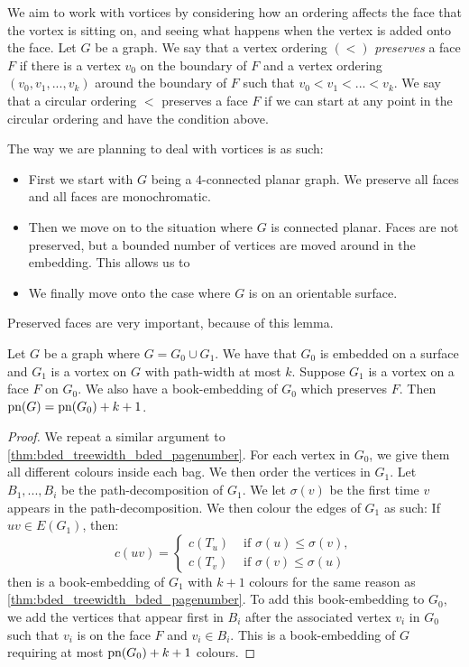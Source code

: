 We aim to work with vortices by considering how an ordering affects the face that the vortex is sitting on, and seeing what happens when the vertex is added onto the face.
Let $G$ be a graph. We say that a vertex ordering $(<)$ \textit{preserves} a face $F$ if there is a vertex $v_0$ on the boundary of $F$ and a vertex ordering $(v_0, v_1, ..., v_k)$ around the boundary of $F$ such that $v_0 < v_1 < ... < v_k$. We say that a circular ordering $<$ preserves a face $F$ if we can start at any point in the circular ordering and have the condition above. 

The way we are planning to deal with vortices is as such:
\begin{itemize}
	\item First we start with $G$ being a $4$-connected planar graph. We preserve all faces and all faces are monochromatic.
	\item Then we move on to the situation where $G$ is connected planar. Faces are not preserved, but a bounded number of vertices are moved around in the embedding. This allows us to 
	\item We finally move onto the case where $G$ is on an orientable surface. 
\end{itemize}


Preserved faces are very important, because of this lemma.

\begin{lemma}\label{lem:preserved_faces_pagenumber}
	Let $G$ be a graph where $G = G_0 \cup G_1$. We have that $G_0$ is embedded on a surface and $G_1$ is a vortex on $G$ with path-width at most $k$. Suppose $G_1$ is a vortex on a face $F$ on $G_0$. We also have a book-embedding of $G_0$ which preserves $F$. Then $\text{pn}(G) = \text{pn}(G_0) + k + 1$. 
\end{lemma}

\begin{proof}
	We repeat a similar argument to \cref{thm:bded_treewidth_bded_pagenumber}. For each vertex in $G_0$, we give them all different colours inside each bag. We then order the vertices in $G_1$. Let $B_1, ..., B_i$ be the path-decomposition of $G_1$. We let $\sigma(v)$ be the first time $v$ appears in the path-decomposition. We then colour the edges of $G_1$ as such: If $uv \in E(G_1)$, then:
	\begin{equation}
		c(uv) = 
		\begin{cases}
			c(T_u) &\text{ if } \sigma(u) \leq \sigma(v),\\
			c(T_v) &\text{ if } \sigma(v) \leq \sigma(u)
		\end{cases}
	\end{equation}
	then is a book-embedding of $G_1$ with $k+1$ colours for the same reason as \cref{thm:bded_treewidth_bded_pagenumber}.
	To add this book-embedding to $G_0$, we add the vertices that appear first in $B_i$ after the associated vertex $v_i$ in $G_0$ such that $v_i$ is on the face $F$ and $v_i \in B_i$. This is a book-embedding of $G$ requiring at most $\text{pn}(G_0) + k + 1$ colours. 
\end{proof}


